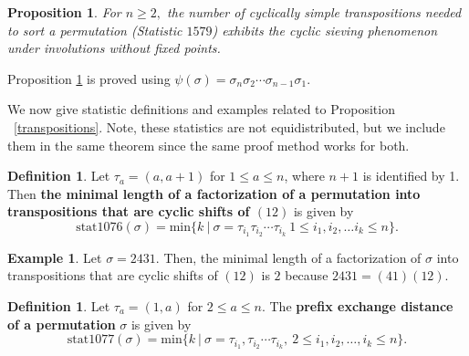 \documentclass{amsart}
\newtheorem{prop}[thm]{Proposition}
\theoremstyle{definition}
\newtheorem{definition}[thm]{Definition}
\newtheorem{example}[thm]{Example}
\begin{document}
\begin{prop}\label{cyclically} For $n \geq 2,$ the number of cyclically simple transpositions needed to sort a permutation (Statistic $1579$) exhibits the cyclic sieving phenomenon under involutions without fixed points.
\end{prop}
Proposition \ref{cyclically} is proved using $\psi(\sigma) = \sigma_n\sigma_2 \dotsm \sigma_{n-1}\sigma_1.$ 

We now give  statistic definitions and examples related to Proposition ~\ref{transpositions}. Note, these statistics are not equidistributed, but we include them in the same theorem since the same proof method works for both.
\begin{definition}
  Let $\tau_a = (a, a+1)$ for $1 \leq a \leq n$, where $n+1$ is identified by 1. Then \textbf{the minimal length of a factorization of a permutation into transpositions that are cyclic shifts of $(12)$} is given by
  \[\textrm{stat1076}(\sigma) = \textrm{min}\{ k \ | \ \sigma = \tau_{i_1}\tau_{i_2}\dotsm \tau_{i_k} \ 1\leq i_1, i_2, \dotsc i_k \leq n\}.\]
\end{definition}

\begin{example}
  Let $\sigma = 2431$. Then, the minimal length of a factorization of $\sigma$ into transpositions that are cyclic shifts of $(12)$ is $2$ because $2431 = (41)(12)$.
\end{example}

\begin{definition}
  Let $\tau_a = (1, a)$ for $2 \leq a \leq n$. The \textbf{prefix exchange distance of a permutation} $\sigma$ is given by
  \[\textrm{stat1077}(\sigma) = \textrm{min}\{k \ | \ \sigma = \tau_{i_1}, \tau_{i_2} \dotsm \tau_{i_k}, \ 2 \leq i_1, i_2, \dotsc, i_k \leq n\}.\]
\end{definition}
\end{document}
